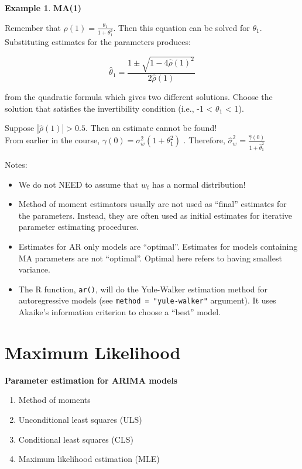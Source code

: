 \documentclass[
]{book}
\providecommand{\tightlist}{%
  \setlength{\itemsep}{0pt}\setlength{\parskip}{0pt}}
\theoremstyle{definition}
\theoremstyle{definition}
\newtheorem{example}{Example}[chapter]
\theoremstyle{definition}
\theoremstyle{definition}
\theoremstyle{remark}
\begin{document}
\begin{example}
\textbf{MA(1)}

Remember that \(\rho(1)=\frac{\theta_1}{1+\theta_1^2}\). Then this equation can be solved for \(\theta_1\). Substituting estimates for the parameters produces:

\[\hat\theta_1=\frac{1\pm \sqrt{1-4\hat\rho(1)^2}}{2\hat\rho(1)}\]

from the quadratic formula which gives two different solutions. Choose the solution that satisfies the invertibility condition (i.e., -1 \textless{} \(\theta_1\) \textless{} 1).

Suppose \(|\hat\rho(1)| > 0.5\). Then an estimate cannot be found!\\
From earlier in the course, \(\gamma(0)=\sigma_w^2(1+\theta_1^2)\) . Therefore, \(\hat\sigma_w^2=\frac{\hat\gamma(0)}{1+\hat\theta_1^2}\)
\end{example}

Notes:

\begin{itemize}
\tightlist
\item
  We do not NEED to assume that \(w_t\) has a normal distribution!
\item
  Method of moment estimators usually are not used as ``final'' estimates for the parameters. Instead, they are often used as initial estimates for iterative parameter estimating procedures.\\
\item
  Estimates for AR only models are ``optimal''. Estimates for models containing MA parameters are not ``optimal''. Optimal here refers to having smallest variance.\\
\item
  The R function, \texttt{ar()}, will do the Yule-Walker estimation method for autoregressive models (see \texttt{method\ =\ "yule-walker"} argument). It uses Akaike's information criterion to choose a ``best'' model.
\end{itemize}

\hypertarget{maximum-likelihood}{%
\section{Maximum Likelihood}\label{maximum-likelihood}}

\textbf{Parameter estimation for ARIMA models}

\begin{enumerate}
\def\labelenumi{\arabic{enumi}.}
\tightlist
\item
  Method of moments
\item
  Unconditional least squares (ULS)
\item
  Conditional least squares (CLS)
\item
  Maximum likelihood estimation (MLE)
\end{enumerate}
\end{document}
